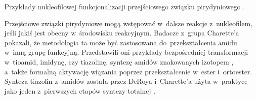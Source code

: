 \begin{marginscheme}[4\baselineskip]
  
  \caption{
    Przykłady nukleofilowej funkcjonalizacji przejściowego związku pirydyniowego
    .
  }
  \label{sch:pyridinium-nu}
\end{marginscheme}
Przejściowe związki pirydyniowe 
  mogą wstępować w~dalsze reakcje z~nukleofilem, jeśli jakiś jest obecny w~środowisku reakcyjnym.
Badacze z~grupa Charette'a pokazali, że metodologia ta może być zastosowana do~przekształcenia amidu w~inną grupę funkcyjną.
Przedstawili oni przykłady bezpośredniej transformacji w~tioamid, imidynę, czy tiazolinę, syntezę amidów znakowanych izotopem ,
  a~także formalną aktywację wiązania  poprzez przekształcenie w~ester i~ortoester.
Synteza tiazolin z~amidów została przez DeRoya i~Charette'a użyta w~praktyce jako jeden z~pierwszych etapów syntezy totalnej
  .


